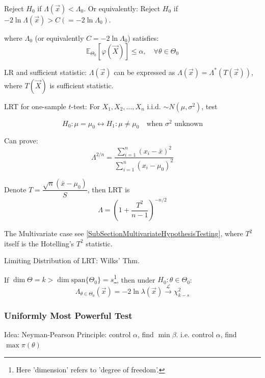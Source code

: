     Reject $H_0$ if $\Lambda(\vec{x})<\Lambda_0$. Or equivalently: Reject $H_0$ if $-2\ln\Lambda(\vec{x})>C(=-2\ln\Lambda_0)$.

    where $\Lambda_0$ (or equivalently $C=-2\ln\Lambda_0$) satisfies:
    \begin{equation}\mathbb{E}_{\Theta_0}[\varphi(\vec{X})]\leq\alpha,\quad\forall\theta\in\Theta_0\end{equation}

    LR and sufficient statistic: $\Lambda(\vec{x})$ can be expressed as $\Lambda(\vec{x})=\Lambda^*(T(\vec{x}))$, where $T(\vec{X})$ is sufficient statistic.


\begin{point}
    LRT for one-sample $ t $-test: For $ X_1,X_2,\ldots,X_n $ i.i.d. $ \sim N(\mu,\sigma ^2) $, test

\[
    H_0: \mu=\mu_0\longleftrightarrow H_1:\mu\neq\mu_0\quad\text{when }\sigma ^2\text{ unknown}
\]

    Can prove:
    \[
        \Lambda^{2/n}=\dfrac{\sum\limits_{i=1}^n(x_i-\bar{x})^2}{\sum\limits_{i=1}^n(x_i-\mu_0)^2} 
    \]
    
    Denote $ T=\dfrac{\sqrt{n}(\bar{x}-\mu_0)}{S}$, then LRT is
    \[
        \Lambda = \left( 1+\dfrac{T^2}{n-1} \right)^{-n/2}
    \]
    
    The Multivariate case see {\autoref{SubSectionMultivariateHypothesisTesting}}, where $ T^2 $ itself is the Hotelling's $ T^2 $ statistic.
    
    

\end{point}



\begin{point}
    Limiting Distribution of LRT: Wilks' Thm.
\end{point}

    

    
    If $\dim\Theta=k>\dim\mathrm{span}\{\Theta_0\}=s$\footnote{Here 'dimension' refers to 'degree of freedom'.}, then under $H_0:\theta\in\Theta_0$:
    \begin{equation}
        \Lambda_{\theta\in\Theta_0}(\vec{x})=-2\ln \lambda(\vec{x})\xrightarrow[]{\mathscr{L}}\chi_{k-s}^2
    \end{equation}

\subsubsection{Uniformly Most Powerful Test}\label{SUbSectionUMP}
    Idea: Neyman-Pearson Principle: control $\alpha$, find $\min\beta$. i.e. control $\alpha$, find $\max\pi(\theta)$

